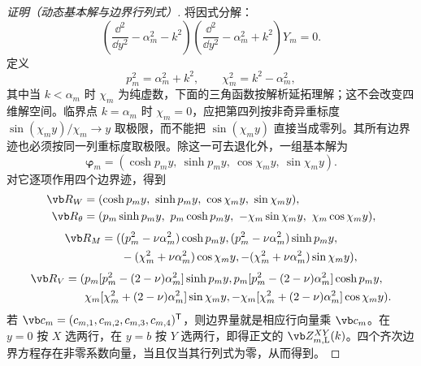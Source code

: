 \begin{proof}[证明（动态基本解与边界行列式）]
将因式分解：
\[
\left(\frac{\dd^2}{\dd y^2}-\alpha_m^2-k^2\right)
\left(\frac{\dd^2}{\dd y^2}-\alpha_m^2+k^2\right)Y_m=0.
\]
定义
\[
 p_m^2=\alpha_m^2+k^2,
 \qquad \chi_m^2=k^2-\alpha_m^2,
\]
其中当 \(k<\alpha_m\) 时 \(\chi_m\) 为纯虚数，下面的三角函数按解析延拓理解；这不会改变四维解空间。临界点 \(k=\alpha_m\) 时 \(\chi_m=0\)，应把第四列按非奇异重标度 \(\sin(\chi_my)/\chi_m\to y\) 取极限，而不能把 \(\sin(\chi_my)\) 直接当成零列。其所有边界迹也必须按同一列重标度取极限。除这一可去退化外，一组基本解为
\[
\boldsymbol\varphi_m
=(\cosh p_my,\ \sinh p_my,\ \cos \chi_my,\ \sin \chi_my).
\]
对它逐项作用四个边界迹，得到
\[
\begin{aligned}
\vb R_W&=(\cosh p_my,\ \sinh p_my,\ \cos \chi_my,\ \sin \chi_my),\\
\vb R_{\theta}&=(p_m\sinh p_my,\ p_m\cosh p_my,\ -\chi_m\sin \chi_my,\ \chi_m\cos \chi_my),
\end{aligned}
\]
\[
\begin{aligned}
\vb R_M=(& (p_m^2-\nu\alpha_m^2)\cosh p_my,
(p_m^2-\nu\alpha_m^2)\sinh p_my,\\
&-(\chi_m^2+\nu\alpha_m^2)\cos \chi_my,
-(\chi_m^2+\nu\alpha_m^2)\sin \chi_my),
\end{aligned}
\]
\[
\begin{aligned}
\vb R_V=(&p_m[p_m^2-(2-\nu)\alpha_m^2]\sinh p_my,
 p_m[p_m^2-(2-\nu)\alpha_m^2]\cosh p_my,\\
&\chi_m[\chi_m^2+(2-\nu)\alpha_m^2]\sin \chi_my,
-\chi_m[\chi_m^2+(2-\nu)\alpha_m^2]\cos \chi_my).
\end{aligned}
\]
若 \(\vb c_m=(c_{m,1},c_{m,2},c_{m,3},c_{m,4})^{\mathsf T}\)，则边界量就是相应行向量乘 \(\vb c_m\)。在 \(y=0\) 按 \(X\) 选两行，在 \(y=b\) 按 \(Y\) 选两行，即得正文的 \(\vb Z_{m,\mathrm L}^{XY}(k)\)。四个齐次边界方程存在非零系数向量，当且仅当其行列式为零，从而得到。
\end{proof}

